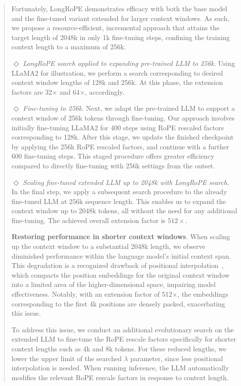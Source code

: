 \begin{abstract}
Fortunately, LongRoPE demonstrates efficacy with both the base model and the fine-tuned variant extended for larger context windows. As such, we propose a resource-efficient, incremental approach that attains the target length of 2048k in only 1k fine-tuning steps, confining the training context length to a maximum of 256k.

$\Diamond$ \textit{LongRoPE search applied to expanding pre-trained LLM to 256k}. Using LLaMA2 for illustration, we perform a search corresponding to desired context window lengths of 128k and 256k. At this phase, the extension factors are 32$\times$ and 64$\times$, accordingly.

$\Diamond$ \textit{Fine-tuning to 256k}. Next, we adapt the pre-trained LLM to support a context window of 256k tokens through fine-tuning. Our approach involves initially fine-tuning LLaMA2 for 400 steps using RoPE rescaled factors corresponding to 128k. After this stage, we update the finished checkpoint by applying the 256k RoPE rescaled factors, and continue with a further 600 fine-tuning steps. This staged procedure offers greater efficiency compared to directly fine-tuning with 256k settings from the outset.

$\Diamond$ \textit{Scaling fine-tuned extended LLM up to 2048k with LongRoPE search}. In the final step, we apply a subsequent search procedure to the already fine-tuned LLM at 256k sequence length. This enables us to expand the context window up to 2048k tokens, all without the need for any additional fine-tuning. The achieved overall extension factor is $512\times$.

\textbf{Restoring performance in shorter context windows}. When scaling up the context window to a substantial 2048k length, we observe diminished performance within the language model's initial context span. This degradation is a recognized drawback of positional interpolation~\cite{pi}, which compacts the position embeddings for the original context window into a limited area of the higher-dimensional space, impairing model effectiveness. Notably, with an extension factor of 512$\times$, the embeddings corresponding to the first 4k positions are densely packed, exacerbating this issue.

To address this issue, we conduct an additional evolutionary search on the extended LLM to fine-tune the RoPE rescale factors specifically for shorter context lengths such as 4k and 8k tokens. For these reduced lengths, we lower the upper limit of the searched $\lambda$ parameter, since less positional interpolation is needed. When running inference, the LLM automatically modifies the relevant RoPE rescale factors in response to context length.


\end{abstract}

